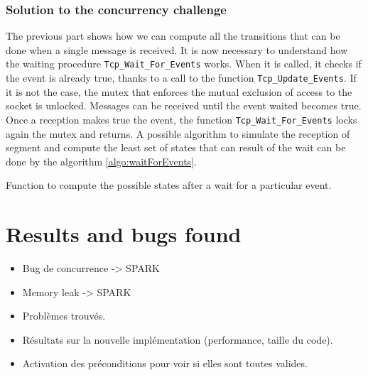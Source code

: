 \documentclass[runningheads]{llncs}
\begin{document}
\subsubsection{Solution to the concurrency challenge}

    The previous part shows how we can compute all the transitions that can be done when a single message is received.
    It is now necessary to understand how the waiting procedure \lstinline{Tcp_Wait_For_Events} works.
    When it is called, it checks if the event is already true, thanks to a call to the function \lstinline{Tcp_Update_Events}.
    If it is not the case, the mutex that enforces the mutual exclusion of access to the socket is unlocked.
    Messages can be received until the event waited becomes true.
    Once a reception makes true the event, the function \lstinline{Tcp_Wait_For_Events} locks again the mutex and returns.
    A possible algorithm to simulate the reception of segment and compute the least set of states that can result of the wait can be done
    by the algorithm \ref{algo:waitForEvents}.

    \begin{algorithm}
        \caption{Function to compute the possible states after a wait for a particular event.}
        \label{algo:waitForEvents}
    \end{algorithm}

\section{Results and bugs found}

    \begin{itemize}
        \item Bug de concurrence -> SPARK
        \item Memory leak -> SPARK
        \item Problèmes trouvés.
        \item Résultats sur la nouvelle implémentation (performance, taille du code).
        \item Activation des préconditions pour voir si elles sont toutes valides.
    \end{itemize}
\end{document}
